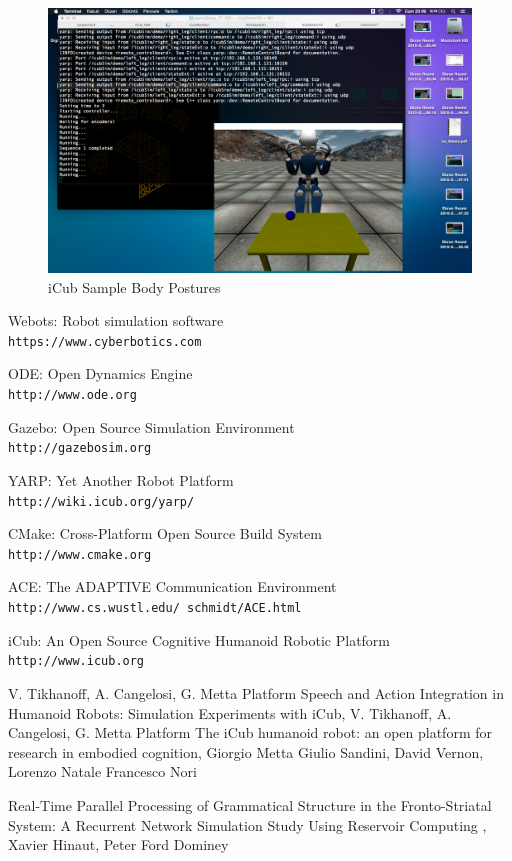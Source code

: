\documentclass[a4paper, 11pt]{report}
\begin{document}
\begin{figure}[h!]
\centering
\includegraphics[width=1.0\linewidth]{neural}
\caption{iCub Sample Body Postures}
\label{fig:neural}
\end{figure}


\begin{thebibliography}{10}
  Webots: Robot simulation software
  \\\texttt{https://www.cyberbotics.com}
  
  ODE: Open Dynamics Engine
  \\\texttt{http://www.ode.org}
  
  Gazebo: Open Source Simulation Environment
  \\\texttt{http://gazebosim.org}
  
  YARP: Yet Another Robot Platform 
  \\\texttt{http://wiki.icub.org/yarp/}
  
  CMake: Cross-Platform Open Source Build System 
  \\\texttt{http://www.cmake.org}
  
  ACE: The ADAPTIVE Communication Environment
  \\\texttt{http://www.cs.wustl.edu/~schmidt/ACE.html}
  
  iCub: An Open Source Cognitive Humanoid Robotic Platform
  \\\texttt{http://www.icub.org}
  
    V. Tikhanoff, A. Cangelosi, G. Metta Platform
   Speech and Action Integration in Humanoid Robots: Simulation Experiments 
   with iCub, V. Tikhanoff, A. Cangelosi, G. Metta Platform 
  The iCub humanoid robot: an open platform for research in 
  embodied cognition, Giorgio Metta Giulio Sandini, David Vernon, Lorenzo Natale
  Francesco Nori

  Real-Time Parallel Processing of Grammatical Structure in the 
  Fronto-Striatal System: A Recurrent Network Simulation Study Using Reservoir 
  Computing , Xavier Hinaut, Peter Ford Dominey
  
  \end{thebibliography}
\end{document}
